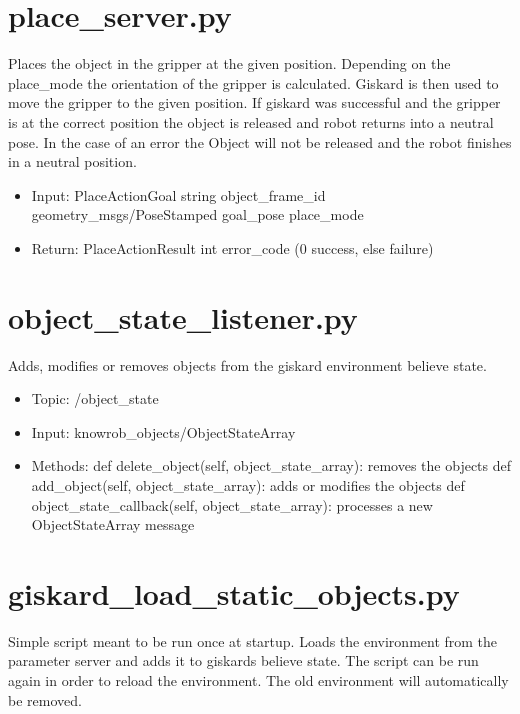 \documentclass[main.tex]{subfiles}
\begin{document}
		\section{place\_server.py}  
		Places the object in the gripper at the given position. Depending on the place\_mode the orientation of the gripper is calculated. Giskard is then used to move the gripper to the given position. If giskard was successful and the gripper is at the correct position the object is released and robot returns into a neutral pose. In the case of an error the Object will not be released and the robot finishes in a neutral position. 
		
		\begin{itemize}
			\item Input: PlaceActionGoal 
				\subitem string object\_frame\_id 
				\subitem geometry\_msgs/PoseStamped goal\_pose
				\subitem place\_mode
			\item Return: PlaceActionResult
				\subitem int error\_code (0 success, else failure)
		\end{itemize}
	
		\section{object\_state\_listener.py} 
		Adds, modifies or removes objects from the giskard environment believe state.
		
		\begin{itemize}
			\item Topic: /object\_state
			\item Input: knowrob\_objects/ObjectStateArray
			\item Methods:
				\subitem def delete\_object(self, object\_state\_array): removes the objects
				\subitem def add\_object(self, object\_state\_array): adds or modifies the objects
				\subitem def object\_state\_callback(self, object\_state\_array): processes a new ObjectStateArray message
		\end{itemize}
		
		\section{giskard\_load\_static\_objects.py} 
		Simple script meant to be run once at startup. Loads the environment from the parameter server and adds it to giskards believe state. 
		The script can be run again in order to reload the environment. The old environment will automatically be removed.

	\endgroup
\end{document}
